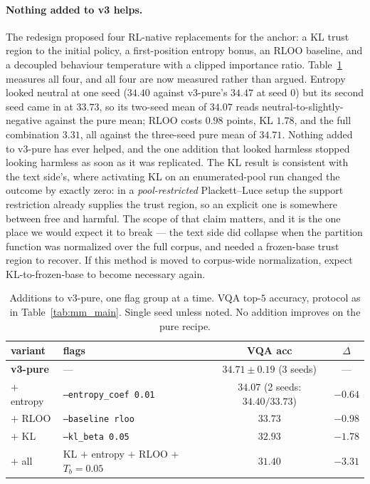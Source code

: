 \paragraph{Nothing added to v3 helps.} The redesign proposed four RL-native replacements for the
anchor: a KL trust region to the initial policy, a first-position entropy bonus, an RLOO
baseline, and a decoupled behaviour temperature with a clipped importance ratio.
Table~\ref{tab:mm_v3add} measures all four, and all four are now measured rather than argued.
Entropy looked neutral at one seed ($34.40$ against v3-pure's $34.47$ at seed $0$) but its second
seed came in at $33.73$, so its two-seed mean of $34.07$ reads neutral-to-slightly-negative
against the pure mean; RLOO costs $0.98$ points, KL $1.78$, and the full combination $3.31$, all
against the three-seed pure mean of $34.71$. Nothing added to v3-pure has ever helped, and the
one addition that looked harmless stopped looking harmless as soon as it was replicated.
The KL result is consistent with
the text side's, where activating KL on an enumerated-pool run changed the outcome by exactly
zero: in a \emph{pool-restricted} Plackett--Luce setup the support restriction already supplies
the trust region, so an explicit one is somewhere between free and harmful. The scope of that
claim matters, and it is the one place we would expect it to break --- the text side did collapse
when the partition function was normalized over the full corpus, and needed a frozen-base trust
region to recover. If this method is moved to corpus-wide normalization, expect KL-to-frozen-base
to become necessary again.

\begin{table}[t]
\centering\small
\caption{Additions to v3-pure, one flag group at a time. VQA top-$5$ accuracy, protocol as in
Table~\ref{tab:mm_main}. Single seed unless noted. No addition improves on the pure recipe.}
\label{tab:mm_v3add}
\begin{tabular}{llcc}
\toprule
variant & flags & VQA acc & $\Delta$ \\
\midrule
\textbf{v3-pure} & ---                                      & $\mathbf{34.71 \pm 0.19}$ (3 seeds) & --- \\
$+$ entropy      & \texttt{--entropy\_coef 0.01}            & $34.07$ (2 seeds: $34.40 / 33.73$) & $-0.64$ \\
$+$ RLOO         & \texttt{--baseline rloo}                 & $33.73$ & $-0.98$ \\
$+$ KL           & \texttt{--kl\_beta 0.05}                 & $32.93$ & $-1.78$ \\
$+$ all          & KL $+$ entropy $+$ RLOO $+$ $T_b{=}0.05$ & $31.40$ & $-3.31$ \\
\bottomrule
\end{tabular}
\end{table}


